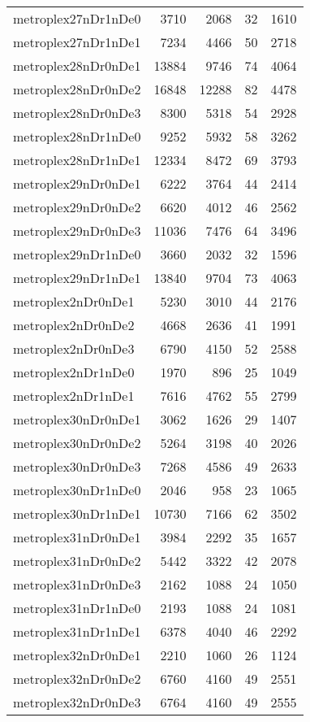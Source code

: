 \begin{tabular}{lrrrr}
metroplex27nDr1nDe0 & 3710 & 2068 & 32 & 1610 \\
metroplex27nDr1nDe1 & 7234 & 4466 & 50 & 2718 \\
metroplex28nDr0nDe1 & 13884 & 9746 & 74 & 4064 \\
metroplex28nDr0nDe2 & 16848 & 12288 & 82 & 4478 \\
metroplex28nDr0nDe3 & 8300 & 5318 & 54 & 2928 \\
metroplex28nDr1nDe0 & 9252 & 5932 & 58 & 3262 \\
metroplex28nDr1nDe1 & 12334 & 8472 & 69 & 3793 \\
metroplex29nDr0nDe1 & 6222 & 3764 & 44 & 2414 \\
metroplex29nDr0nDe2 & 6620 & 4012 & 46 & 2562 \\
metroplex29nDr0nDe3 & 11036 & 7476 & 64 & 3496 \\
metroplex29nDr1nDe0 & 3660 & 2032 & 32 & 1596 \\
metroplex29nDr1nDe1 & 13840 & 9704 & 73 & 4063 \\
metroplex2nDr0nDe1 & 5230 & 3010 & 44 & 2176 \\
metroplex2nDr0nDe2 & 4668 & 2636 & 41 & 1991 \\
metroplex2nDr0nDe3 & 6790 & 4150 & 52 & 2588 \\
metroplex2nDr1nDe0 & 1970 & 896 & 25 & 1049 \\
metroplex2nDr1nDe1 & 7616 & 4762 & 55 & 2799 \\
metroplex30nDr0nDe1 & 3062 & 1626 & 29 & 1407 \\
metroplex30nDr0nDe2 & 5264 & 3198 & 40 & 2026 \\
metroplex30nDr0nDe3 & 7268 & 4586 & 49 & 2633 \\
metroplex30nDr1nDe0 & 2046 & 958 & 23 & 1065 \\
metroplex30nDr1nDe1 & 10730 & 7166 & 62 & 3502 \\
metroplex31nDr0nDe1 & 3984 & 2292 & 35 & 1657 \\
metroplex31nDr0nDe2 & 5442 & 3322 & 42 & 2078 \\
metroplex31nDr0nDe3 & 2162 & 1088 & 24 & 1050 \\
metroplex31nDr1nDe0 & 2193 & 1088 & 24 & 1081 \\
metroplex31nDr1nDe1 & 6378 & 4040 & 46 & 2292 \\
metroplex32nDr0nDe1 & 2210 & 1060 & 26 & 1124 \\
metroplex32nDr0nDe2 & 6760 & 4160 & 49 & 2551 \\
metroplex32nDr0nDe3 & 6764 & 4160 & 49 & 2555 \\

\end{tabular}
